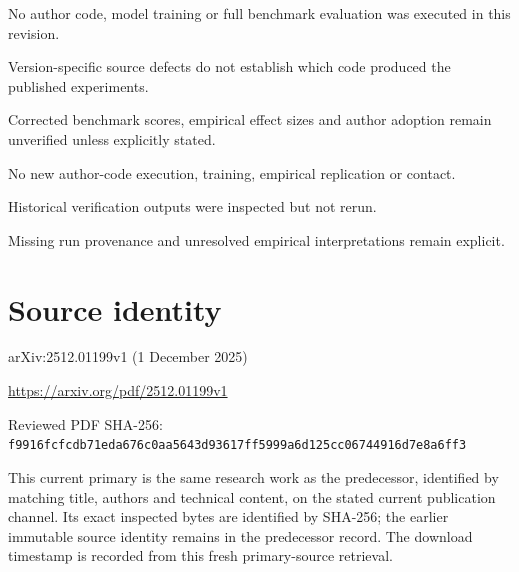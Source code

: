 \documentclass[11pt]{article}
\begin{document}
No author code, model training or full benchmark evaluation was executed in this revision.\par

Version-specific source defects do not establish which code produced the published experiments.\par

Corrected benchmark scores, empirical effect sizes and author adoption remain unverified unless explicitly stated.\par

No new author-code execution, training, empirical replication or contact.\par

Historical verification outputs were inspected but not rerun.\par

Missing run provenance and unresolved empirical interpretations remain explicit.\par

\section*{Source identity}

arXiv:2512.01199v1 (1 December 2025)

\url{https://arxiv.org/pdf/2512.01199v1}

Reviewed PDF SHA-256: \nolinkurl{f9916fcfcdb71eda676c0aa5643d93617ff5999a6d125cc06744916d7e8a6ff3}

This current primary is the same research work as the predecessor, identified by matching title, authors and technical content, on the stated current publication channel. Its exact inspected bytes are identified by SHA-256; the earlier immutable source identity remains in the predecessor record. The download timestamp is recorded from this fresh primary-source retrieval.
\end{document}
